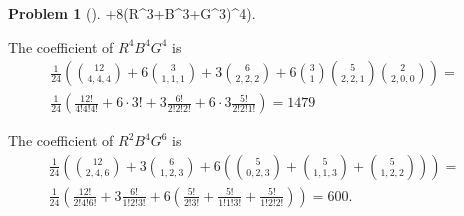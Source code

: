 \documentclass[10pt,]{book}
\theoremstyle{plain}
\theoremstyle{definition}
\newtheorem{activity}[project]{Problem}
\theoremstyle{definition}
\numberwithin{equation}{chapter}
\newcommand{\amp}{&}
\begin{document}
\begin{activity}[]
+8(R^3+B^3+G^3)^4\Big)\).%
\par
The coefficient of \(R^4B^4G^4\) is%
\begin{align*}
\frac{1}{24}\left(\binom{12}{4,4,4}+6\binom{3}{1,1,1}+3\binom{6}{2,2,2}+
6\binom{3}{1}\binom{5}{2,2,1}\binom{2}{2,0,0}
\right) =\amp\\
\frac{1}{24}\left(\frac{12!}{4!4!4!}+6\cdot3!+3\frac{6!}{2!2!2!}+6\cdot3\frac{5!}{2!2!1!}\right)=1479 \amp
\end{align*}
%
\par
The coefficient of \(R^2B^4G^6\) is%
\begin{align*}
\frac{1}{24}\left(\binom{12}{2,4,6}
+3\binom{6}{1,2,3}+6\left(\binom{5}{0,2,3}+\binom{5}{1,1,3}+\binom{5}{1,2,2}\right)\right) =\amp\\
\frac{1}{24}\left(\frac{12!}{2!4!6!}+3\frac{6!}{1!2!3!}+6\left(\frac{5!}{2!3!}+\frac{5!}{1!1!3!}
+\frac{5!}{1!2!2!}\right)\right)=600.
\end{align*}
%
\end{activity}
\end{document}
